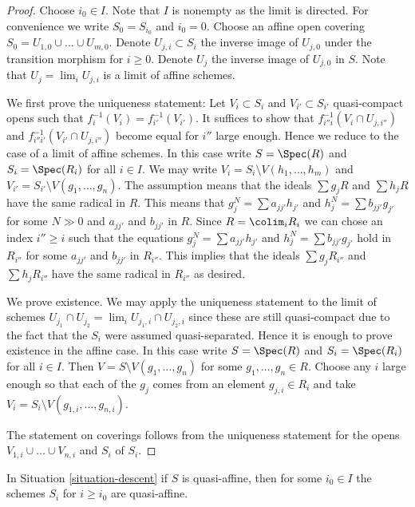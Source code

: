 \begin{proof}
Choose $i_0 \in I$. Note that $I$ is nonempty as the limit is directed.
For convenience we write $S_0 = S_{i_0}$ and $i_0 = 0$.
Choose an affine open covering $S_0 = U_{1, 0} \cup \ldots \cup U_{m, 0}$.
Denote $U_{j, i} \subset S_i$ the inverse image of $U_{j, 0}$
under the transition morphism for $i \geq 0$.
Denote $U_j$ the inverse image of $U_{j, 0}$ in $S$.
Note that $U_j = \lim_i U_{j, i}$ is a limit of affine
schemes.

\medskip\noindent
We first prove the uniqueness statement: Let
$V_i \subset S_i$ and $V_{i'} \subset S_{i'}$
quasi-compact opens such that $f_i^{-1}(V_i) = f_{i'}^{-1}(V_{i'})$.
It suffices to show that $f_{i''i}^{-1}(V_i \cap U_{j, i''})$ and
$f_{i''i'}^{-1}(V_{i'} \cap U_{j, i''})$ become equal
for $i''$ large enough. Hence we reduce to the case
of a limit of affine schemes. In this case write
$S = \Spec(R)$ and $S_i = \Spec(R_i)$ for all $i \in I$.
We may write $V_i = S_i \setminus V(h_1, \ldots, h_m)$
and $V_{i'} = S_{i'} \setminus V(g_1, \ldots, g_n)$.
The assumption means that the ideals
$\sum g_jR$ and $\sum h_jR$ have the same radical
in $R$. This means that $g_j^N = \sum a_{jj'}h_{j'}$ and
$h_j^N = \sum b_{jj'} g_{j'}$ for some $N \gg 0$ and $a_{jj'}$
and $b_{jj'}$ in $R$.
Since $R = \colim_i R_i$ we can chose an index
$i'' \geq i$ such that the equations
$g_j^N = \sum a_{jj'}h_{j'}$ and
$h_j^N = \sum b_{jj'} g_{j'}$ hold in $R_{i''}$ for some
$a_{jj'}$ and $b_{jj'}$ in $R_{i''}$. This implies that
the ideals $\sum g_jR_{i''}$ and $\sum h_jR_{i''}$ have the same radical
in $R_{i''}$ as desired.

\medskip\noindent
We prove existence. We may apply the uniqueness statement to
the limit of schemes
$U_{j_1} \cap U_{j_2} = \lim_i U_{j_1, i} \cap U_{j_2, i}$
since these are still quasi-compact due to the fact that the
$S_i$ were assumed quasi-separated.
Hence it is enough to prove existence in the affine case.
In this case write $S = \Spec(R)$ and $S_i = \Spec(R_i)$
for all $i \in I$. Then $V = S \setminus V(g_1, \ldots, g_n)$
for some $g_1, \ldots, g_n \in R$. Choose any $i$ large enough
so that each of the $g_j$ comes from an element $g_{j, i} \in R_i$
and take $V_i = S_i \setminus V(g_{1, i}, \ldots, g_{n, i})$.

\medskip\noindent
The statement on coverings follows from the uniqueness statement
for the opens $V_{1, i} \cup \ldots \cup V_{n, i}$ and $S_i$ of $S_i$.
\end{proof}

\begin{lemma}
\label{lemma-limit-quasi-affine}
In Situation \ref{situation-descent} if $S$ is quasi-affine, then
for some $i_0 \in I$ the schemes $S_i$ for $i \geq i_0$ are quasi-affine.
\end{lemma}

